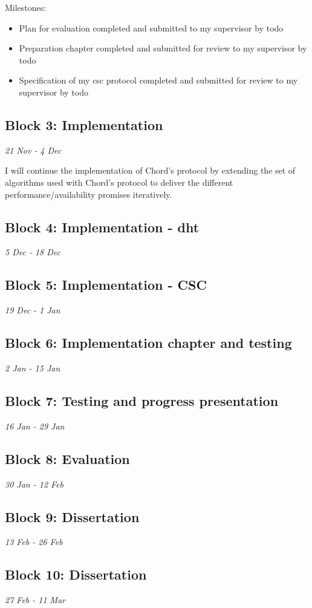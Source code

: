 \documentclass[12pt]{article}
\begin{document}
Milestones:
\begin{itemize}
\item{Plan for evaluation completed and submitted to my supervisor by todo}
\item{Preparation chapter completed and submitted for review to my supervisor by todo}
\item{Specification of my \gls{csc} protocol completed and submitted for review to my supervisor by todo}
\end{itemize}


\subsection{Block 3: Implementation}
\emph{21 Nov - 4 Dec}  %

I will continue the implementation of Chord's protocol by extending the set of algorithms used with Chord's protocol to deliver the different performance/availability promises iteratively.

\subsection{Block 4: Implementation - \gls{dht}}
\emph{5 Dec - 18 Dec}  %
\subsection{Block 5: Implementation - CSC}
\emph{19 Dec - 1 Jan}  %
\subsection{Block 6: Implementation chapter and testing}
\emph{2 Jan - 15 Jan}  %
\subsection{Block 7: Testing and progress presentation}
\emph{16 Jan - 29 Jan} %
\subsection{Block 8: Evaluation}
\emph{30 Jan - 12 Feb} %
\subsection{Block 9: Dissertation}
\emph{13 Feb - 26 Feb} %
\subsection{Block 10: Dissertation}
\emph{27 Feb - 11 Mar} %
\end{document}
